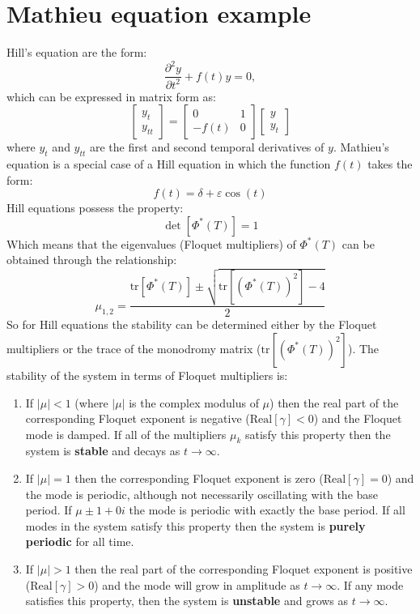 \documentclass{article}
\begin{document}
\newpage
\section*{Mathieu equation example}
Hill's equation are the form:
\begin{equation*}
 \frac{\partial^2y}{\partial{t^2}}+f(t)y=0, 
\end{equation*}
which can be expressed in matrix form as:
 \begin{equation*}
  \begin{bmatrix*}
  y_t \\
  y_{tt}
 \end{bmatrix*}
 =\begin{bmatrix*}
  0 & 1 \\
  -f(t) & 0
 \end{bmatrix*}
 \begin{bmatrix*}
  y \\
  y_t 
 \end{bmatrix*}
 \end{equation*}
 where $y_t$ and $y_{tt}$ are the first and second temporal derivatives of $y$.
Mathieu's equation is a special case of a Hill equation in which the function $f(t)$ takes the form: 
\begin{equation*}
 f(t)=\delta+\varepsilon\cos(t)
\end{equation*}
Hill equations possess the property:
\begin{equation*}
 \det[\Phi^*(T)]=1
\end{equation*}
Which means that the eigenvalues (Floquet multipliers) of $\Phi^*(T)$ 
can be obtained through the relationship:
\begin{equation}
 \mu_{1,2}=\frac{\text{tr}[\Phi^*(T)]\pm\sqrt{\text{tr}[(\Phi^*(T))^2]-4}}{2}
 \label{eq:eigroots}
\end{equation}
So for Hill equations the stability can be determined either by the Floquet multipliers 
or the trace of the monodromy matrix ($\text{tr}[(\Phi^*(T))^2]$). 
The stability of the system in terms of Floquet multipliers is:
\begin{enumerate}[label=(\alph*)]
\item If $|\mu|<1$ (where $|\mu|$ is the complex modulus of $\mu$) then the real part of the corresponding
 Floquet exponent is negative ($\text{Real}[\gamma]<0$) and the Floquet mode is 
 damped. If all of the multipliers $\mu_k$ satisfy this property then the system is 
 \textbf{stable} and decays as $t\rightarrow\infty$.
\item If $|\mu|=1$ then the corresponding
 Floquet exponent is zero ($\text{Real}[\gamma]=0$) and the mode is 
 periodic, although not necessarily oscillating with the base period. 
 If $\mu\pm1+0i$ the mode is periodic with exactly the base period.
 If all modes in the system satisfy this property then the system 
 is \textbf{purely periodic} for all time.
\item If $|\mu|>1$ then the real part of the corresponding
 Floquet exponent is positive ($\text{Real}[\gamma]>0$) and the mode 
 will grow in amplitude as $t\rightarrow\infty$. If any mode satisfies this 
 property, then the system is \textbf{unstable} and grows as $t\rightarrow\infty$.
\end{enumerate}
\end{document}
